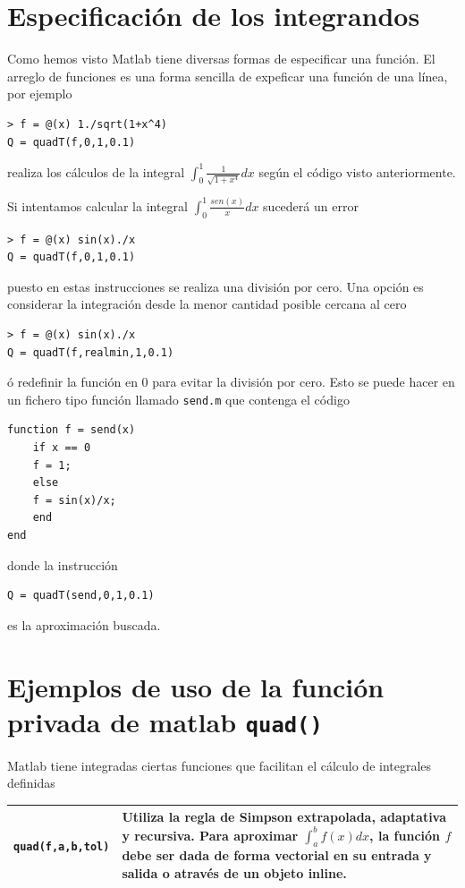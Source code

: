 \documentclass[11pt]{article}
\begin{document}
\section{Especificaci\'on de los integrandos}
Como hemos visto Matlab tiene diversas formas de especificar una funci\'on. El arreglo de funciones es una forma sencilla de expeficar una funci\'on de una l\'inea, por ejemplo
\begin{lstlisting}
> f = @(x) 1./sqrt(1+x^4)
Q = quadT(f,0,1,0.1)
\end{lstlisting}
realiza los c\'alculos de la integral $\int_0^1\frac{1}{\sqrt{1+x^4}}dx$ seg\'un el c\'odigo visto anteriormente.

Si intentamos calcular la integral $\int_0^1\frac{sen(x)}{x}dx$ suceder\'a un error
\begin{lstlisting}
> f = @(x) sin(x)./x
Q = quadT(f,0,1,0.1)
\end{lstlisting}
puesto en estas instrucciones se realiza una divisi\'on por cero. Una opci\'on es considerar la integraci\'on desde la menor cantidad posible cercana al cero 
\begin{lstlisting}
> f = @(x) sin(x)./x
Q = quadT(f,realmin,1,0.1)
\end{lstlisting}
\'o redefinir la funci\'on en $0$ para evitar la divisi\'on por cero. Esto se puede hacer en un fichero tipo funci\'on llamado \texttt{send.m} 
que contenga el c\'odigo
\begin{lstlisting}
function f = send(x)
	if x == 0
	f = 1;
	else
	f = sin(x)/x;
	end
end
\end{lstlisting}
donde la instrucci\'on
\begin{lstlisting}
Q = quadT(send,0,1,0.1)
\end{lstlisting}
es la aproximaci\'on buscada.

\section{Ejemplos de uso de la funci\'on privada de matlab \texttt{quad()}}

Matlab tiene integradas ciertas funciones que facilitan el c\'alculo de integrales definidas

\begin{longtable}{||c|p{}||}
\hline
\texttt{quad(f,a,b,tol)} 			& Utiliza la regla de Simpson extrapolada, adaptativa y recursiva. Para aproximar $\int_a^b f(x)dx$, la funci\'on $f$ debe ser dada de forma vectorial en su entrada y salida o atrav\'es de un objeto inline. \\
\hline
\end{longtable}
\end{document}
